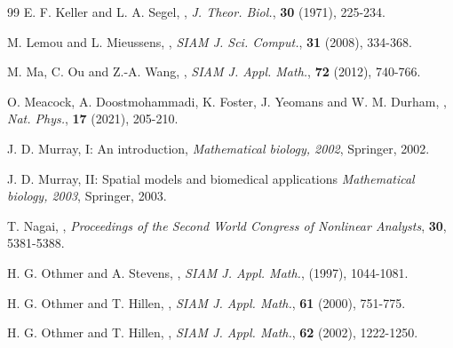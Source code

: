 \documentclass{aims} %
\theoremstyle{definition}
\begin{document}
{\begin{thebibliography}{99}
\newblock E. F. Keller and L. A. Segel, 
\newblock {},
\newblock \emph{J. Theor. Biol.}, \textbf{30} (1971), 225-234.

\newblock M. Lemou and L. Mieussens, 
\newblock {},
\newblock \emph{SIAM J. Sci. Comput.}, \textbf{31} (2008), 334-368.

\newblock M. Ma, C. Ou and Z.-A. Wang, 
\newblock {},
\newblock \emph{SIAM J. Appl. Math.}, \textbf{72} (2012), 740-766.

\newblock O. Meacock, A. Doostmohammadi, K. Foster, J. Yeomans and W. M. Durham,
\newblock {},
\newblock \emph{Nat. Phys.}, \textbf{17} (2021), 205-210.

\newblock J. D. Murray, 
\newblock I: An introduction,
\newblock \emph{Mathematical biology, 2002}, Springer, 2002.

\newblock J. D. Murray, 
\newblock II: Spatial models and biomedical applications
\newblock \emph{Mathematical biology, 2003}, Springer, 2003.

\newblock T. Nagai, 
\newblock {},
\newblock \emph{Proceedings of the Second World Congress of Nonlinear Analysts}, \textbf{30}, 5381-5388.

\newblock H. G. Othmer and A. Stevens, 
\newblock {},
\newblock \emph{SIAM J. Appl. Math.}, \textbf{} (1997), 1044-1081.

\newblock H. G. Othmer and T. Hillen, 
\newblock {},
\newblock \emph{SIAM J. Appl. Math.}, \textbf{61} (2000), 751-775.

\newblock H. G. Othmer and T. Hillen, 
\newblock {},
\newblock \emph{SIAM J. Appl. Math.}, \textbf{62} (2002), 1222-1250.


\end{thebibliography}}
\end{document}
